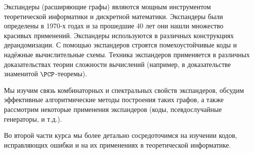 Экспандеры (расширяющие графы) являются мощным инструментом теоретической информатики и дискретной
математики. Экспандеры были определены в 1970-х годах и за прошедшие 40 лет они нашли множество красивых
применений. Экспандеры используются в различных конструкциях дерандомизации. С помощью экспандеров
строятся помехоустойчивые коды и надёжные вычислительные схемы. Техника экспандеров применяется в
различных доказательствах теории сложности вычислений (например, в доказательстве знаменитой
$\PCP$-теоремы).

Мы изучим связь комбинаторных и спектральных свойств экспандеров, обсудим эффективные алгоритмические
методы построения таких графов, а также рассмотрим некоторые применения экспандеров (коды,
псевдослучайные генераторы, и т.д.).

Во второй части курса мы более детально сосредоточимся на изучении кодов, исправляющих ошибки и на их
применениях в теоретической информатике.